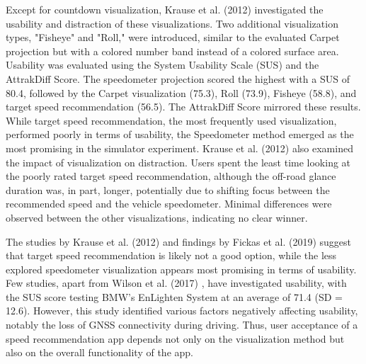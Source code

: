 Except for countdown visualization, Krause et al. (2012) \cite{krause_traffic_2012} investigated the usability and distraction of these visualizations. Two additional visualization types, "Fisheye" and "Roll," were introduced, similar to the evaluated Carpet projection but with a colored number band instead of a colored surface area. Usability was evaluated using the System Usability Scale (SUS) and the AttrakDiff Score. The speedometer projection scored the highest with a SUS of 80.4, followed by the Carpet visualization (75.3), Roll (73.9), Fisheye (58.8), and target speed recommendation (56.5). The AttrakDiff Score mirrored these results. While target speed recommendation, the most frequently used visualization, performed poorly in terms of usability, the Speedometer method emerged as the most promising in the simulator experiment. Krause et al. (2012) \cite{krause_traffic_2012} also examined the impact of visualization on distraction. Users spent the least time looking at the poorly rated target speed recommendation, although the off-road glance duration was, in part, longer, potentially due to shifting focus between the recommended speed and the vehicle speedometer. Minimal differences were observed between the other visualizations, indicating no clear winner.

The studies by Krause et al. (2012) \cite{krause_traffic_2012} and findings by Fickas et al. (2019) \cite{fickas_fast_2019} suggest that target speed recommendation is likely not a good option, while the less explored speedometer visualization appears most promising in terms of usability. Few studies, apart from Wilson et al. (2017) \cite{wilson_driver_2017}, have investigated usability, with the SUS score testing BMW's EnLighten System at an average of 71.4 (SD = 12.6). However, this study identified various factors negatively affecting usability, notably the loss of GNSS connectivity during driving. Thus, user acceptance of a speed recommendation app depends not only on the visualization method but also on the overall functionality of the app.

